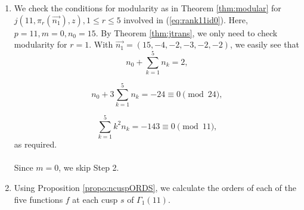 \documentclass[12pt]{amsart}
\theoremstyle{definition}
\theoremstyle{remark}
\numberwithin{equation}{section}
\newcommand\thm[1]{\ref{thm:#1}}
\newcommand\propo[1]{\ref{propo:#1}}
\newcommand\eqn[1]{(\ref{eq:#1})}
\begin{document}
\begin{enumerate}
\item[Step 1] We check the conditions for modularity as in Theorem \thm{modular} for $j(11,\pi_r(\overrightarrow{n_1}),z), 1\leq r \leq 5$ involved in \eqn{rank11id0}. Here, $p=11, m=0, n_0=15$. By Theorem \thm{jtrans}, we only need to check modularity for $r=1$. With $\overrightarrow{n_1}=(15,-4,-2,-3,-2,-2)$, we easily see that 
$$n_0+\displaystyle \sum_{k=1}^{5}n_k=2,$$ 

$$n_0+3 \displaystyle \sum_{k=1}^{5}n_k = -24 \equiv 0\pmod {24},$$

$$\displaystyle \sum_{k=1}^{5}k^2 n_k = -143 \equiv 0 \pmod {11},$$
as required.
\\\\
Since $m=0$, we skip Step 2.
\\
\item[Step 3] Using Proposition \propo{ncuspORDS},
 we calculate the orders of each of the five functions $f$ at each cusp 
$s$ of 
$\Gamma_1(11)$.


\end{enumerate}
\end{document}
